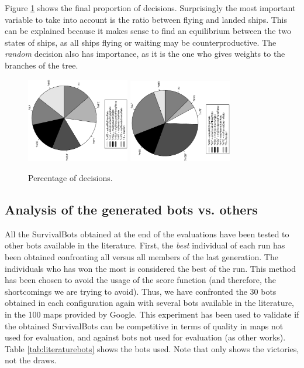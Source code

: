 \documentclass[conference]{IEEEtran}
\begin{document}
Figure \ref{figura:tarta_decissions} shows the final proportion of decisions. Surprisingly the most important variable to take into account is the ratio between flying and landed ships. This can be explained because it makes sense to find an equilibrium between the two states of ships, as all ships flying or waiting may be counterproductive. The {\em random} decision also has importance, as it is the one who gives weights to the branches of the tree.
\begin{figure}[htb]
\tiny
\begin{center}


    \includegraphics[trim=1cm 5.5cm 0cm 5.5cm, clip=true,width=4.5cm,angle=-90]{./imags/distribution_initial_condition.eps}
    \includegraphics[trim=1cm 5.5cm 0cm 5.5cm, clip=true,width=4.5cm,angle=-90]{./imags/distribution_final_condition.eps}



\end{center}
\caption{Percentage of decisions.}
\label{figura:tarta_decissions}
\end{figure}

\subsection{Analysis of the generated bots vs. others}
\label{subsec:Analysisothers}

All the SurvivalBots obtained at the end of the evaluations have been tested to other bots available in the literature. First, the {\em best} individual of each run has been obtained confronting all versus all members of the last generation. The individuals who has won the most is considered the best of the run. This method has been chosen to avoid the usage of the score function (and therefore, the shortcomings we are trying to avoid). Thus, we have confronted the 30 bots obtained in each configuration again with several bots available in the literature, in the 100 maps provided by Google. This experiment has been used to validate if the obtained SurvivalBots can be competitive in terms of quality in maps not used for evaluation, and against bots not used for evaluation (as other works). Table \ref{tab:literaturebots} shows the bots used. Note that only shows the victories, not the draws.
\end{document}

